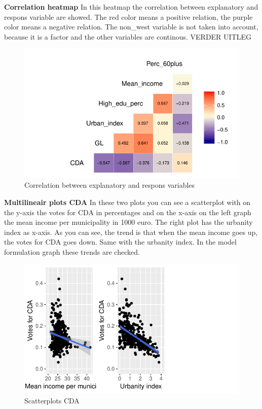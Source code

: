 \documentclass[11pt,]{article}
\begin{document}
\textbf{Correlation heatmap} In this heatmap the correlation between
explanatory and respons variable are showed. The red color means a
positive relation, the purple color means a negative relation. The
non\_west variable is not taken into account, because it is a factor and
the other variables are continous. VERDER UITLEG

\begin{figure}[H]

{\centering \includegraphics{Report_files/figure-latex/correlation_heatmap-1} 

}

\caption{Correlation between explanatory and respons variables}\label{fig:correlation_heatmap}
\end{figure}

\textbf{Multilineair plots CDA } In these two plots you can see a
scatterplot with on the y-axis the votes for CDA in percentages and on
the x-axis on the left graph the mean income per municipality in 1000
euro. The right plot has the urbanity index as x-axis. As you can see,
the trend is that when the mean income goes up, the votes for CDA goes
down. Same with the urbanity index. In the model formulation graph these
trends are checked.

\begin{figure}[H]

{\centering \includegraphics{Report_files/figure-latex/unnamed-chunk-5-1} 

}

\caption{Scatterplots CDA}\label{fig:unnamed-chunk-5}
\end{figure}
\end{document}
